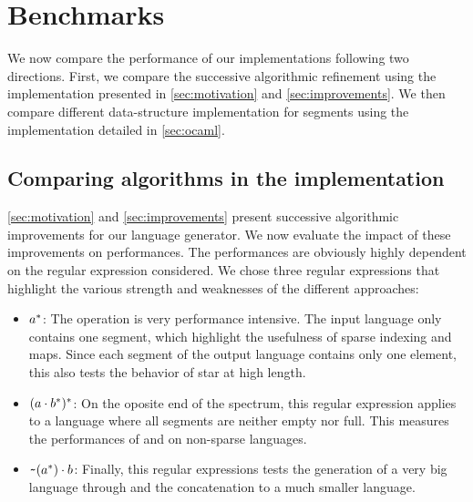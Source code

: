 \section{Benchmarks}
\label{sec:bench}

We now compare the performance of our implementations following two directions.
First, we compare the successive algorithmic refinement using the \haskell
implementation presented in \cref{sec:motivation} and \cref{sec:improvements}.
We then compare different data-structure implementation for segments
using the \ocaml implementation detailed in \cref{sec:ocaml}.

\subsection{Comparing algorithms in the \haskell implementation}

\cref{sec:motivation} and \cref{sec:improvements} present successive
algorithmic improvements for our language generator. We now evaluate
the impact of these improvements on performances.
The performances are obviously highly dependent on the regular expression
considered. We chose three regular expressions that highlight
the various strength and weaknesses of the different approaches:
\begin{itemize}
\item$a^*$: The  operation is very performance intensive.
  The input language only contains one segment, which highlight the usefulness
  of sparse indexing and maps. Since each segment of the output language contains
  only one element, this also tests the behavior of star at high length.
\item $(a \cdot{b^*})^*$: On the oposite end of the spectrum, this
  regular expression applies  to a language where all segments
  are neither empty nor full. This measures the performances of 
  and  on non-sparse languages.
\item $\texttt{\textasciitilde}{(a^*)} \cdot{b}$: Finally, this regular expressions
  tests the generation of a very big language through  and the
  concatenation to a much smaller language.
\end{itemize}


